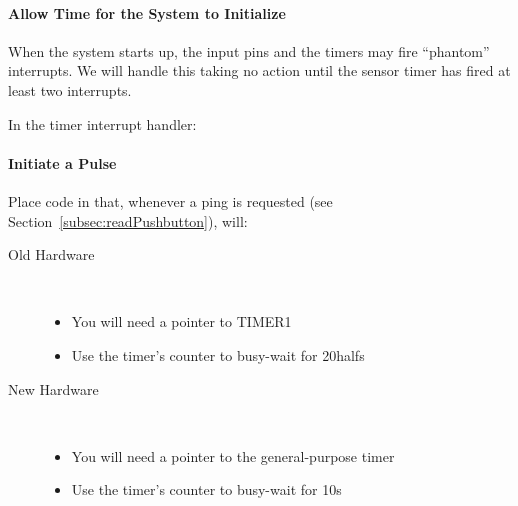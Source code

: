 \paragraph{Allow Time for the System to Initialize}

When the system starts up, the input pins and the timers may fire ``phantom'' interrupts.
We will handle this taking no action until the sensor timer has fired at least two interrupts.

In the timer interrupt handler:
\begin{description}
\end{description}

\paragraph{Initiate a Pulse}
Place code in  that, whenever a ping is requested (see Section~\ref{subsec:readPushbutton}), will:
\begin{description}
    \begin{description}
        \item[Old Hardware] \phantom{x} \\
        \begin{itemize}
            \item You will need a pointer to TIMER1
            \item Use the timer's counter to busy-wait for 20half\textmu s
        \end{itemize}
        \item[New Hardware] \phantom{x} \\
        \begin{itemize}
            \item You will need a pointer to the general-purpose timer
            \item Use the timer's counter to busy-wait for 10\textmu s
        \end{itemize}
    \end{description}
\end{description}

